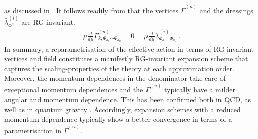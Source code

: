 \documentclass[aps,twocolumn,prd,superscriptaddress]{revtex4-2}
\begin{document}
%
as discussed in \cite{Pawlowski:2005xe}. It follows readily from  that the vertices $\bar\Gamma^{(n)}$ and the dressings $\bar\lambda_{\Phi^n}^{(i)}$ are RG-invariant, 
%
\begin{align} 
 \mu\frac{d}{d \mu}   \bar \Gamma^{(n)}_{k,\Phi_{a_1} \cdots \Phi_{a_n}} =0=  \mu\frac{d}{d \mu}   \bar \lambda^{(i)}_{\Phi_{a_1} \cdots \Phi_{a_n}} \,.
	\label{eq:RGmuInv}
\end{align}
%
In summary, a reparametrisation of the effective action in terms of RG-invariant vertices and field constitutes a manifestly RG-invariant expansion scheme that captures the scaling-properties of the theory at each approximation order. Moreover, the momentum-dependences in the denominator take care of exceptional momentum dependences and the $\bar\Gamma^{(n)}$ typically have a milder angular and momentum dependence. This has been confirmed both in QCD, \cite{Mitter:2014wpa, Cyrol:2016zqb, Cyrol:2017ewj} as well as in quantum gravity \cite{Denz:2016qks}. Accordingly, expansion schemes with a reduced momentum dependence typically show a better convergence in terms of a parametrisation in $\bar\Gamma^{(n)}$. 
\end{document}
